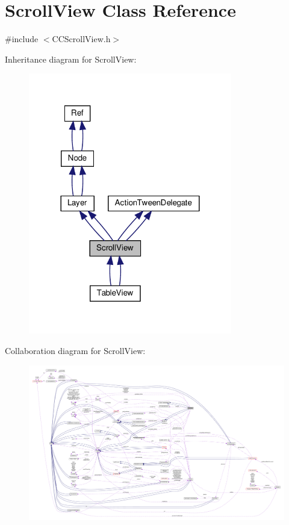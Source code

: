 \hypertarget{classScrollView}{}\section{Scroll\+View Class Reference}
\label{classScrollView}


{\ttfamily \#include $<$C\+C\+Scroll\+View.\+h$>$}



Inheritance diagram for Scroll\+View\+:
\nopagebreak
\begin{figure}[H]
\begin{center}
\leavevmode
\includegraphics[width=252pt]{classScrollView__inherit__graph}
\end{center}
\end{figure}


Collaboration diagram for Scroll\+View\+:
\nopagebreak
\begin{figure}[H]
\begin{center}
\leavevmode
\includegraphics[width=350pt]{classScrollView__coll__graph}
\end{center}
\end{figure}
